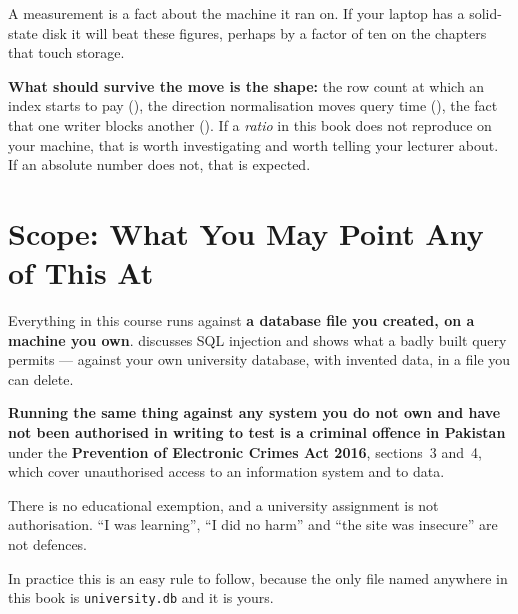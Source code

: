 \begin{alertbox}
A measurement is a fact about the machine it ran on. If your laptop has a
solid-state disk it will beat these figures, perhaps by a factor of ten on the
chapters that touch storage.

\smallskip
\textbf{What should survive the move is the shape:} the row count at which an
index starts to pay (), the direction normalisation moves query
time (), the fact that one writer blocks another
(). If a \emph{ratio} in this book does not reproduce on
your machine, that is worth investigating and worth telling your lecturer
about. If an absolute number does not, that is expected.
\end{alertbox}

\section{Scope: What You May Point Any of This At}

\begin{alertbox}
Everything in this course runs against \textbf{a database file you created, on
a machine you own}.  discusses SQL injection and shows what a
badly built query permits --- against your own university database, with
invented data, in a file you can delete.

\smallskip
\textbf{Running the same thing against any system you do not own and have not
been authorised in writing to test is a criminal offence in Pakistan} under the
\textbf{Prevention of Electronic Crimes Act 2016}, sections~3 and~4, which
cover unauthorised access to an information system and to data.

\smallskip
There is no educational exemption, and a university assignment is not
authorisation. ``I was learning'', ``I did no harm'' and ``the site was
insecure'' are not defences.

\smallskip
In practice this is an easy rule to follow, because the only file named
anywhere in this book is \texttt{university.db} and it is yours.
\end{alertbox}
